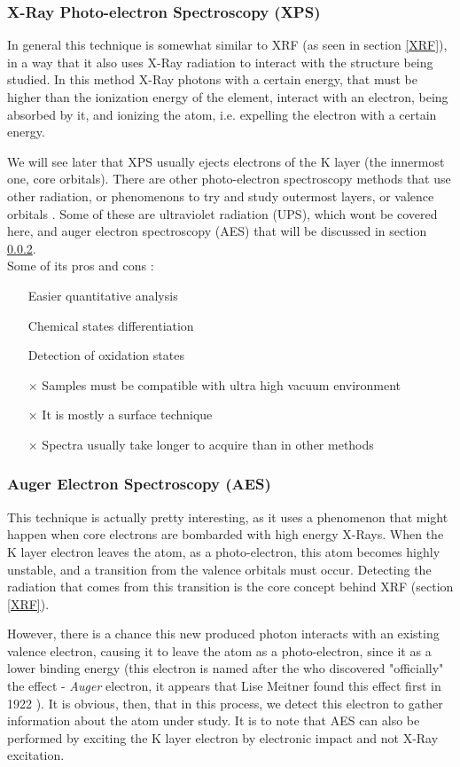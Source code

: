 \documentclass[]{article}
\begin{document}
\subsubsection{X-Ray Photo-electron Spectroscopy (XPS)} \label{XPS}
In general this technique is somewhat similar to XRF (as seen in section \ref{XRF}), in a way that it also uses X-Ray radiation to interact with the structure being studied. In this method X-Ray photons with a certain energy, that must be higher than the ionization energy of the element, interact with an electron, being absorbed by it, and ionizing the atom, i.e. expelling the electron with a certain energy.
\par We will see later that XPS usually ejects electrons of the K layer (the innermost one, core orbitals). There are other photo-electron spectroscopy methods that use other radiation, or phenomenons  to try and study outermost layers, or valence orbitals \cite{JMH_Modern}. Some of these are ultraviolet radiation (UPS), which wont be covered here, and auger electron spectroscopy (AES) that will be discussed in section \ref{AES}.\\

Some of its pros and cons \cite{CL_XPS}:
\begin{itemize}
\item[\checkmark] Easier quantitative analysis
\item[\checkmark] Chemical states differentiation
\item[\checkmark] Detection of oxidation states
\item[$\times$] Samples must be compatible with ultra high vacuum environment
\item[$\times$] It is mostly a surface technique
\item[$\times$] Spectra usually take longer to acquire than in other methods
\end{itemize}

\subsubsection{Auger Electron Spectroscopy (AES)} \label{AES} %
This technique is actually pretty interesting, as it uses a phenomenon that might happen when core electrons are bombarded with high energy X-Rays. When the K layer electron leaves the atom, as a photo-electron, this atom becomes highly unstable, and a transition from the valence orbitals must occur. Detecting the radiation that comes from this transition is the core concept behind XRF (section \ref{XRF}). 
\par However, there is a chance this new produced photon interacts with an existing valence electron, causing it to leave the atom as a photo-electron, since it as a lower binding energy (this electron is named after the who discovered "officially" the effect - \textit{Auger} electron, it appears that Lise Meitner found this effect first in 1922 \cite{AU_Wiki}). It is obvious, then, that in this process, we detect this electron to gather information about the atom under study. It is to note that AES can also be performed by exciting the K layer electron by electronic impact and not X-Ray excitation.\\
\end{document}
